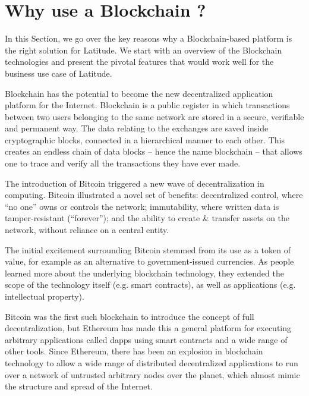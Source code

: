 \section{Why use a Blockchain ?}\label{sec:blockchain}

In this Section, we go over the key reasons why a Blockchain-based platform is the right solution for Latitude. We
start with an overview of the Blockchain technologies and present the pivotal features that would work well for the
business use case of Latitude.

Blockchain has the potential to become the new decentralized application platform for the Internet. Blockchain is a
public register in which transactions between two users belonging to the same network are stored in a secure, verifiable
and permanent way. The data relating to the exchanges are saved inside cryptographic blocks, connected in a hierarchical
manner to each other. This creates an endless chain of data blocks -- hence the name blockchain -- that allows one to
trace and verify all the transactions they have ever made.

The introduction of Bitcoin \cite{nakamoto2009bitcoin} triggered a new wave of decentralization in computing.
Bitcoin illustrated a novel set of benefits: decentralized control, where ``no one'' owns or controls the network;
immutability, where written data is tamper-resistant (``forever''); and the ability to create \& transfer assets on the
network, without reliance on a central entity.

The initial excitement surrounding Bitcoin stemmed from its use as a token of value, for example as an alternative to
government-issued currencies.  As people learned more about the underlying blockchain technology, they extended the
scope of the technology itself (e.g. smart contracts), as well as applications (e.g. intellectual property).

Bitcoin was the first such blockchain to introduce the concept of full decentralization, but Ethereum has made this a
general platform for executing arbitrary applications called dapps using smart contracts and a wide range of other
tools. Since Ethereum, there has been an explosion in blockchain technology to allow a wide range of distributed
decentralized applications to run over a network of untrusted arbitrary nodes over the planet, which almost mimic the
structure and spread of the Internet.


